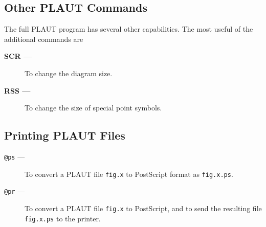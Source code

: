 \subsection{Other PLAUT Commands}

The full PLAUT program has several other capabilities.
The most useful of the additional commands are

\begin{description}     
\item[\bf SCR ---]  To change the diagram size.
\item[\bf RSS ---]  To change the size of special point symbols.
\end{description}


\subsection{Printing PLAUT Files}
 
\begin{description}

\item[{\tt @ps} ---]
To convert a PLAUT file {\tt fig.x} to {\sc Post}{\sc Script} format
as {\tt fig.x.ps}.

\item[{\tt @pr} ---]
To convert a PLAUT file {\tt fig.x} to {\sc Post}{\sc Script}, and to
send the resulting file {\tt fig.x.ps} to the printer.

\end{description}


